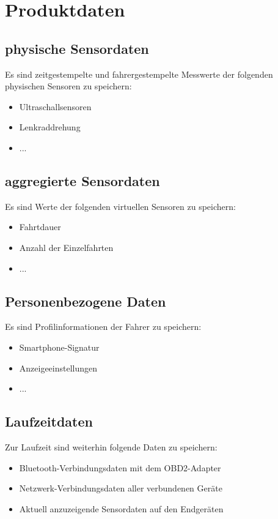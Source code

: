 \documentclass[pflichtenheft.tex]{subfiles}
\begin{document}
\chapter{Produktdaten}

\section{\mkd physische Sensordaten}
Es sind zeitgestempelte und fahrergestempelte Messwerte der folgenden physischen Sensoren zu speichern:
\begin{itemize}
\item
Ultraschallsensoren
\item
Lenkraddrehung
\item
...

\end{itemize}

\section{\mkd aggregierte Sensordaten}
Es sind Werte der folgenden virtuellen Sensoren zu speichern:
\begin{itemize}
\item
Fahrtdauer
\item
Anzahl der Einzelfahrten
\item
...

\end{itemize}

\section{\mkd Personenbezogene Daten}
Es sind Profilinformationen der Fahrer zu speichern:
\begin{itemize}
\item
Smartphone-Signatur
\item
Anzeigeeinstellungen
\item
...
\end{itemize}

\section{\mkd Laufzeitdaten}
Zur Laufzeit sind weiterhin folgende Daten zu speichern:
\begin{itemize}
\item
Bluetooth-Verbindungsdaten mit dem OBD2-Adapter
\item
Netzwerk-Verbindungsdaten aller verbundenen Geräte
\item
Aktuell anzuzeigende Sensordaten auf den Endgeräten


\end{itemize}
\end{document}
